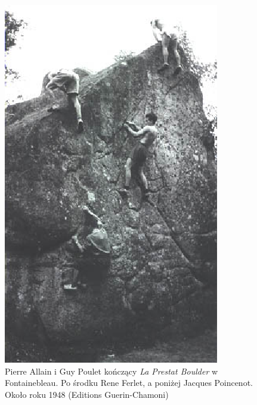 \documentclass{article}
\begin{document}
\begin{figure}[!htbp]
	\begin{center}
		\includegraphics[width=0.7\linewidth]{images/allain-2.eps}
	\end{center}
	\caption{Pierre Allain i Guy Poulet kończący \textit{La Prestat Boulder} w Fontainebleau. Po środku Rene Ferlet, a poniżej Jacques Poincenot. Około roku 1948 (Editions Guerin-Chamoni) \cite{gill-history2}}
	\label{allain-2}
\end{figure}
\end{document}
